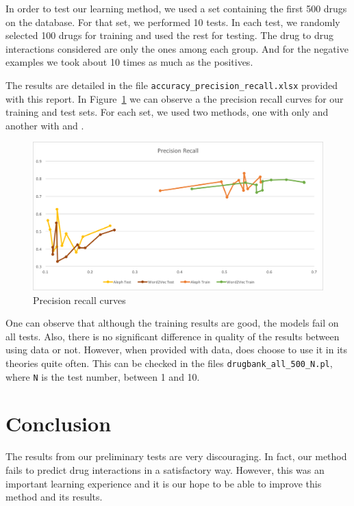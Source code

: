 \documentclass[12pt, openany]{book}
\begin{document}
In order to test our learning method, we used a set containing the first 500 drugs on the database. For that set, we performed 10 tests. In each test, we randomly selected 100 drugs for training and used the rest for testing. The drug to drug interactions considered are only the ones among each group. And for the negative examples we took about 10 times as much as the positives.

The results are detailed in the file \texttt{accuracy\_precision\_recall.xlsx} provided with this report. In Figure~\ref{chart} we can observe a the precision recall curves for our training and test sets. For each set, we used two methods, one with only \alephilp and another with \alephilp and \wordvec.

\begin{figure}[ht]
\begin{center}
\includegraphics[width=15cm]{chart.png}
\caption{Precision recall curves}
\label{chart}
\end{center}
\end{figure}

One can observe that although the training results are good, the models fail on all tests. Also, there is no significant difference in quality of the results between using \wordvec data or not. However, when provided with \wordvec data, \alephilp does choose to use it in its theories quite often. This can be checked in the files \texttt{drugbank\_all\_500\_N.pl}, where \texttt{N} is the test number, between 1 and 10.

\chapter{Conclusion}

The results from our preliminary tests are very discouraging. In fact, our method fails to predict drug interactions in a satisfactory way. However, this was an important learning experience and it is our hope to be able to improve this method and its results.
\end{document}
